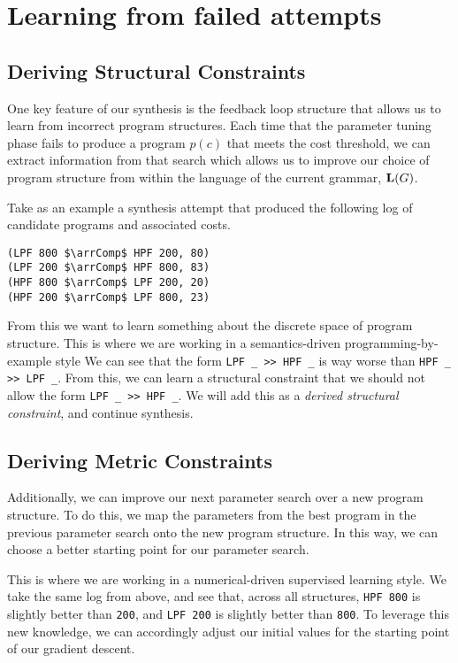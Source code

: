 \section{Learning from failed attempts}
\label{sec:feedback}


\subsection{Deriving Structural Constraints}
One key feature of our synthesis is the feedback loop structure that allows us to learn from incorrect program structures.
Each time that the parameter tuning phase fails to produce a program $p(c)$ that meets the cost threshold, we can extract information from that search which allows us to improve our choice of program structure from within the language of the current grammar, $\mathbf{L}(G)$.


\begin{exmp}
Take as an example a synthesis attempt that produced the following log of candidate programs and associated costs.

\begin{lstlisting}
(LPF 800 $\arrComp$ HPF 200, 80)
(LPF 200 $\arrComp$ HPF 800, 83)
(HPF 800 $\arrComp$ LPF 200, 20)
(HPF 200 $\arrComp$ LPF 800, 23)
\end{lstlisting}

From this we want to learn something about the discrete space of program structure. 
This is where we are working in a semantics-driven programming-by-example style
We can see that the form \texttt{LPF \_ >> HPF \_} is way worse than \texttt{HPF \_ >> LPF \_}.
From this, we can learn a structural constraint that we should not allow the form \texttt{LPF \_ >> HPF \_}.
We will add this as a \textit{derived structural constraint}, and continue synthesis.
\end{exmp}

\subsection{Deriving Metric Constraints}
Additionally, we can improve our next parameter search over a new program structure.
To do this, we map the parameters from the best program in the previous parameter search onto the new program structure.
In this way, we can choose a better starting point for our parameter search.

This is where we are working in a numerical-driven supervised learning style.
We take the same log from above, and see that, across all structures, \texttt{HPF 800} is slightly better than \texttt{200}, 
  and \texttt{LPF 200} is slightly better than \texttt{800}.
To leverage this new knowledge, we can accordingly adjust our initial values for the starting point of our gradient descent.
